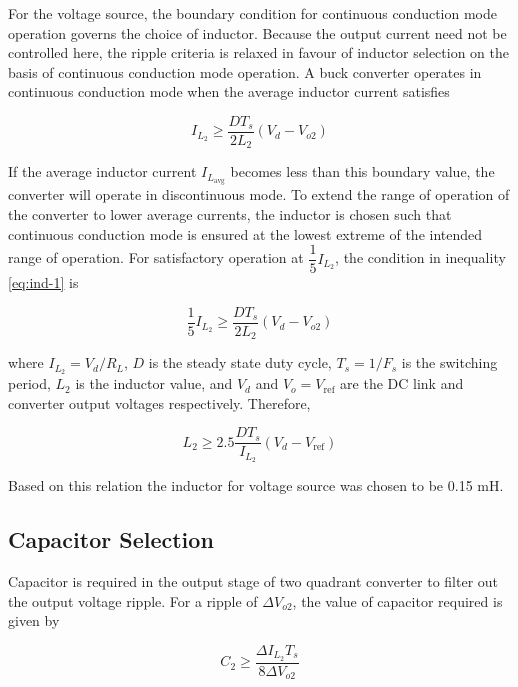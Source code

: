 \documentclass[a4paper]{IEEEtran}
\begin{document}
	For the voltage source, the boundary condition for continuous conduction mode operation governs the choice of inductor. Because the output current need not be controlled here, the ripple criteria is relaxed in favour of inductor selection on the basis of continuous conduction mode operation. A buck converter operates in continuous conduction mode when the average inductor current satisfies \cite{book:768263}

	\begin{equation}
		I_{L_2} \geq \dfrac{DT_s}{2L_2}(V_d-V_{o2})
		\label{eq:ind-2}
	\end{equation}

	If the average inductor current $I_{L_{\text{avg}}}$ becomes less than this boundary value, the converter will operate in discontinuous mode. To extend the range of operation of the converter to lower average currents, the inductor is chosen such that continuous conduction mode is ensured at the lowest extreme of the intended range of operation. For satisfactory operation \cite{muhamad2005design} at $\dfrac{1}{5}I_{L_2}$, the condition in inequality \eqref{eq:ind-1} is

	\begin{equation}
		\dfrac{1}{5}I_{L_2} \geq \dfrac{DT_s}{2L_2}(V_d-V_{o2})
		\label{eq:ind-3}
	\end{equation}

	where $I_{L_2} = V_d / R_L$, $D$ is the steady state duty cycle, $T_s = 1 / F_s$ is the switching period, $L_2$ is the inductor value, and $V_d$ and $V_o = V_{\text{ref}}$ are the DC link and converter output voltages respectively. 
	Therefore,

	\begin{equation}
		L_2 \geq 2.5\dfrac{DT_s}{I_{L_2}}(V_d-V_{\text{ref}})
		\label{eq:ind-4}
	\end{equation}

	Based on this relation the inductor for voltage source was chosen to be 0.15 mH.

\subsection{Capacitor Selection}
	Capacitor is required in the output stage of two quadrant converter to filter out the output voltage ripple. For a ripple of $\Delta V_{o2}$, the value of capacitor required is given by\cite{book:768263}

	\begin{equation}
		C_2 \geq \dfrac{\Delta I_{L_2}T_s}{8\Delta V_{o2}}
		\label{eq:ind-4a}
	\end{equation}
\end{document}
